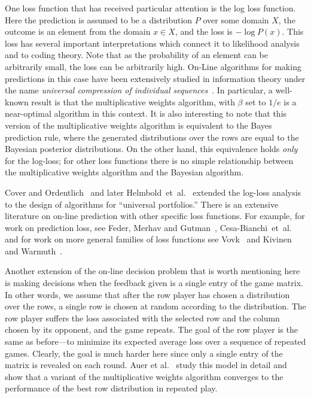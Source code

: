 One loss function that has received particular attention is the log
loss function. Here the prediction is assumed to be a distribution $P$
over some domain $X$, the outcome is an element from the domain $x \in
X$, and the loss is $-\log P(x)$. This loss has several important
interpretations which connect it to likelihood analysis and to coding
theory. Note that as the probability of an element can be arbitrarily
small, the loss can be arbitrarily high.
On-Line algorithms for making predictions in this case have been
extensively studied in information theory under the name {\em
universal compression of individual sequences}~\cite{Ziv78,Shtarkov87}. 
In particular, a well-known result is that the
multiplicative weights algorithm, with $\beta$ set to $1/e$ is a
near-optimal algorithm in this context. 
It is also interesting to note that this version of the multiplicative
weights algorithm is equivalent to the Bayes prediction rule, where the
generated distributions over the rows are equal to the Bayesian
posterior distributions. On the other hand, this equivalence holds
{\em only} for the log-loss; for other loss functions there is no
simple relationship between the multiplicative weights algorithm and the
Bayesian algorithm.

Cover and Ordentlich~\cite{Cover91,CoverOr96} and
later Helmbold~et~al.~\cite{HelmboldScSiWa98}
extended the log-loss analysis to the design of
algorithms for ``universal portfolios.''  There is an extensive
literature on on-line prediction with other specific loss functions.
For example, for work on prediction loss, see Feder, Merhav and
Gutman~\cite{FederMeGu92},
Cesa-Bianchi~et~al.~\cite{CesabianchiFrHeHaScWa97} and for work on
more general
families of loss functions see Vovk~\cite{Vovk98} and Kivinen and
Warmuth~\cite{KivinenWa97}.

Another extension of the on-line decision problem that is worth
mentioning here is making decisions when the feedback given is a
single entry of the game matrix. In other words, we assume that after
the row player has chosen a distribution over the rows, a single row
is chosen at random according to the distribution. The row player
suffers the loss associated with the selected row and the column
chosen by its opponent, and the game
repeats.
The goal of the row player is the same as before---to minimize its
expected average loss over a sequence of repeated games. Clearly, the
goal is much harder here since only a single entry of the matrix is
revealed on each round.
Auer et al.~\cite{AuerCeFrSc95} study this model in detail and
show that a
variant of the multiplicative weights algorithm converges to the
performance of the best row distribution in repeated play.

